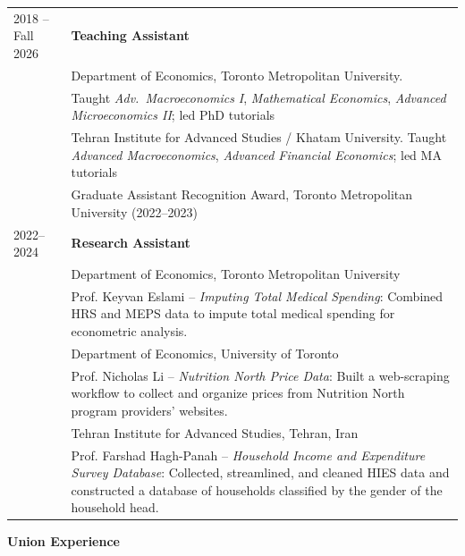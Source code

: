 \documentclass[11pt]{article}
\begin{document}
\begin{tabular}{p{2.5cm} p{15cm}}
  2018 -- Fall 2026 & \textbf{Teaching Assistant} \\[2pt]
  & Department of Economics, Toronto Metropolitan University. \\
  &
    Taught \textit{Adv.\ Macroeconomics I}, \textit{Mathematical Economics},
    \textit{Advanced Microeconomics II}; led PhD tutorials \\[6pt]

  &
    Tehran Institute for Advanced Studies / Khatam University.
    Taught \textit{Advanced Macroeconomics}, \textit{Advanced Financial Economics}; led MA tutorials \\[3pt]
  & {\scriptsize Graduate Assistant Recognition Award, Toronto Metropolitan University (2022--2023)} \\[9pt]

  2022--2024 & \textbf{Research Assistant} \\[2pt]
  & Department of Economics, Toronto Metropolitan University \\
  & {\scriptsize Prof. Keyvan Eslami -- \textit{Imputing Total Medical Spending}: Combined HRS and MEPS data to impute total medical spending for econometric analysis.} \\[3pt]
  & Department of Economics, University of Toronto \\
  & {\scriptsize Prof. Nicholas Li -- \textit{Nutrition North Price Data}: Built a web-scraping workflow to collect and organize prices from Nutrition North program providers' websites.} \\[3pt]
  & Tehran Institute for Advanced Studies, Tehran, Iran \\
  & {\scriptsize Prof. Farshad Hagh-Panah -- \textit{Household Income and Expenditure Survey Database}: Collected, streamlined, and cleaned HIES data and constructed a database of households classified by the gender of the household head.} \\
\end{tabular}

\vspace{9pt}
\textbf{Union Experience}\\[3pt]
\end{document}
